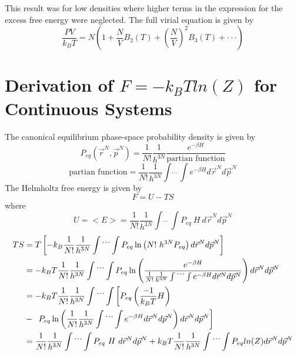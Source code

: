\documentclass[double,12pt]{beavtex}
\begin{document}
This result was for low densities where higher terms in the 
expression for the excess free energy were neglected. The full virial 
equation is given by
\begin{equation}\frac{PV}{k_BT}=N\left(1+\frac{N}{V}B_2(T)+\left(\frac{N}{V}\right)^2B_3(T)+ \cdot\cdot\cdot\right) \end{equation}


\section{Derivation of $F = -k_BTln(Z)$ for Continuous Systems}
The canonical equilibrium phase-space probability density is given by
\begin{equation}P_{eq}(\vec r^N, \vec p^N)=\frac{1}{N!}\frac{1}{h^{3N}}\frac{e^{-\beta H}}{\text{partian function}}\end{equation}
\begin{equation}{\text{partian function}}=\frac{1}{N!}\frac{1}{h^{3N}}\int\dot~\dot~\dot~\int e^{-\beta H} d\vec r^{N} d\vec p^{N}\end{equation}
The Helmholtz free energy is given by 
\begin{equation}\label{F=U-TS}F = U - TS\end{equation}
where
\begin{equation}U = <E> = \frac{1}{N!}\frac{1}{h^{3N}}\int\dot~\dot~\dot~\int P_{eq}~H~d\vec r^{N} d\vec p^{N}\end{equation}
\begin{align}
 TS &= T\left[-k_B\frac{1}{N!}\frac{1}{h^{3N}}\int\dot~\dot~\dot~\int P_{eq}\operatorname{ln}\left(N!~h^{3N}P_{eq}\right) d\vec r^{N} d\vec p^{N}\right]  \nonumber \\
	&= -k_BT\frac{1}{N!}\frac{1}{h^{3N}}\int\dot~\dot~\dot~\int P_{eq}\operatorname{ln}\left(\frac{e^{-\beta H}}{\frac{1}{N!}\frac{1}{h^{3N}}\int\dot~\dot~\dot~\int e^{-\beta H} d\vec r^{N} d\vec p^{N}}\right) d\vec r^{N} d\vec p^{N}  \nonumber \\
    &= -k_BT\frac{1}{N!}\frac{1}{h^{3N}}\int\dot~\dot~\dot~\int \left[P_{eq}\left(\frac{-1}{k_BT}H\right)\color{white}\right]\color{black} \nonumber \\ 
    &- \color{white}\left[\color{black} P_{eq}\ln\left(\frac{1}{N!}\frac{1}{h^{3N}}\int\dot~\dot~\dot~\int e^{-\beta H} d\vec r^{N} d\vec p^{N}\right) \color{black}d\vec r^{N} d\vec p^{N}\right] \nonumber \\ 
    &= \frac{1}{N!}\frac{1}{h^{3N}}\int\dot~\dot~\dot~\int P_{eq}~H~d\vec r^{N} d\vec p^{N} +k_BT\frac{1}{N!}\frac{1}{h^{3N}}\int\dot~\dot~\dot~\int P_{eq}ln(Z)d\vec r^{N} d\vec p^{N}   \nonumber 
\end{align}  
\end{document}
